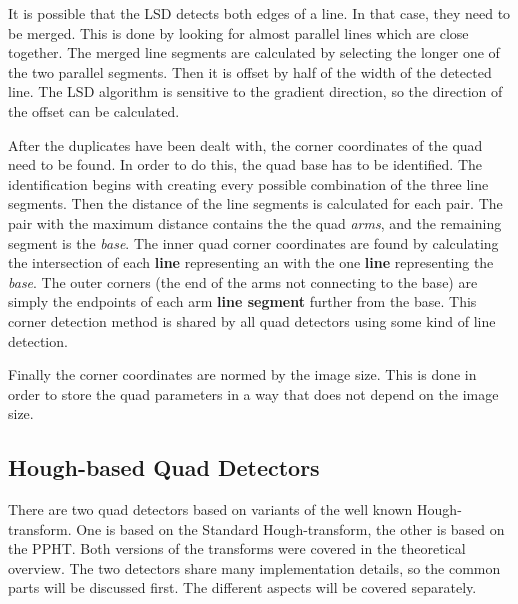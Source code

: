 It is possible that the LSD detects both edges of a line.
In that case, they need to be merged.
This is done by looking for almost parallel lines which are close together.
The merged line segments are calculated by selecting the longer one of the two parallel segments.
Then it is offset by half of the width of the detected line.
The LSD algorithm is sensitive to the gradient direction, so the direction of the offset can be calculated.

After the duplicates have been dealt with, the corner coordinates of the quad need to be found.
In order to do this, the quad base has to be identified.
The identification begins with creating every possible combination of the three line segments.
Then the distance of the line segments is calculated for each pair.
The pair with the maximum distance contains the the quad \textit{arms}, and the remaining segment is the \textit{base}.
The inner quad corner coordinates are found by calculating the intersection of each \textbf{line} representing an  with the one \textbf{line} representing the \textit{base}.
The outer corners (the end of the arms not connecting to the base) are simply the endpoints of each arm \textbf{line segment} further from the base.
This corner detection method is shared by all quad detectors using some kind of line detection.

Finally the corner coordinates are normed by the image size.
This is done in order to store the quad parameters in a way that does not depend on the image size.

\subsection{Hough-based Quad Detectors}

There are two quad detectors based on variants of the well known Hough-transform.
One is based on the Standard Hough-transform, the other is based on the PPHT.
Both versions of the transforms were covered in the theoretical overview.
The two detectors share many implementation details, so the common parts will be discussed first.
The different aspects will be covered separately.

